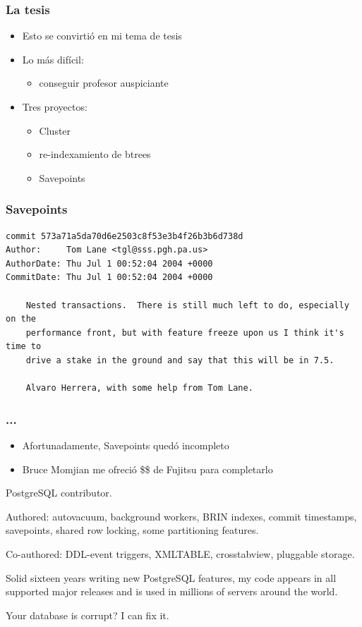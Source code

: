 \begin{frame}
  \frametitle{La tesis}

	\begin{itemize}
		\item Esto se convirtió en mi tema de tesis
		\item Lo más difícil:
			\begin{itemize}
				\item conseguir profesor auspiciante
			\end{itemize}
		\item Tres proyectos:
		\begin{itemize}
			\item Cluster
			\item re-indexamiento de btrees
			\item Savepoints
		\end{itemize}
	\end{itemize}
\end{frame}

\begin{frame}[containsverbatim]
  \frametitle{Savepoints}

\footnotesize
\begin{Verbatim}[xleftmargin=-1cm]
commit 573a71a5da70d6e2503c8f53e3b4f26b3b6d738d
Author:     Tom Lane <tgl@sss.pgh.pa.us>
AuthorDate: Thu Jul 1 00:52:04 2004 +0000
CommitDate: Thu Jul 1 00:52:04 2004 +0000

    Nested transactions.  There is still much left to do, especially on the
    performance front, but with feature freeze upon us I think it's time to
    drive a stake in the ground and say that this will be in 7.5.
    
    Alvaro Herrera, with some help from Tom Lane.
\end{Verbatim}
\end{frame}

\begin{frame}
  \frametitle{...}

	\begin{itemize}
		\item Afortunadamente, Savepoints quedó incompleto
		\item Bruce Momjian me ofreció \$\$ de Fujitsu para completarlo
	\end{itemize}

	\vfill
\small

PostgreSQL contributor.

Authored: autovacuum, background workers, BRIN indexes, commit timestamps, savepoints, shared row locking, some partitioning features.
  
Co-authored: DDL-event triggers, XMLTABLE, crosstabview, pluggable storage.

Solid sixteen years writing new PostgreSQL features, my code appears in all supported major releases and is used in millions of servers around the world.

Your database is corrupt? I can fix it.

\end{frame}

